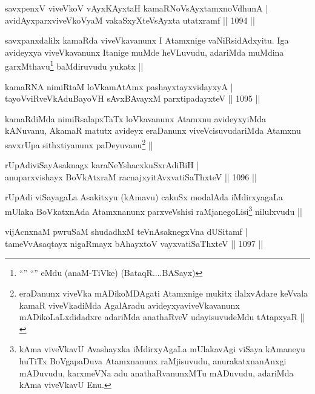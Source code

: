 \begin{shl}
savxpenxV viveVkoV vAyxKAyxtaH kamaRNoV\s sAyx\s \s tamxnoV\s dhunA | \\
avidAyxparxviveVkoV\s yaM vakaSxyXteV\s sAyxta utatxramf \hfill||  1094 ||  
\end{shl}

\begin{artha}
savxpanxdalilx kamaRda viveVkavanunx I Atamxnige vaNiRsidAdxyitu. Iga avideyxya viveVkavanunx Itanige muMde heVLuvudu, adariMda muMdina garxMthavu\footnote{``\stext'' ``\stext'' eMdu (anaM-TiVke) (BataqR....BASayx)} baMdiruvudu yukatx ||
\end{artha}


\begin{shl}
kamaRNA nimiRtaM loVkamAtAmx pashayxtayxvidayxyA | \\
tayoVviRveVkAduBayoVH sAvxBAvayxM parxtipadayxteV \hfill||  1095 ||  
\end{shl}

\begin{artha}
kamaRdiMda nimiRsalapxTaTx loVkavanunx Atamxnu avideyxyiMda kANuvanu, AkamaR matutx avideyx eraDanunx viveVcisuvudariMda Atamxnu savxrUpa sithxtiyanunx paDeyuvanu\footnote{eraDanunx viveVka mADikoMDAgati Atamxnige mukitx ilalxvAdare keVvala kamaR viveVkadiMda AgalAradu avideyxyaviveVkavanunx mADikoLaLxdidadxre adariMda anathaRveV udayisuvudeMdu tAtapxyaR ||} ||
\end{artha}


\begin{shl}
rUpAdiviSayAsaknagx karaNeYshacxkuSxrAdiBiH | \\
anuparxvishayx BoVkAtxraM racnajxyitAvx\s vatiSaThxteV \hfill||  1096 ||  
\end{shl}

\begin{artha}
rUpAdi viSayagaLa Asakitxyu (kAmavu) cakuSx modalAda iMdirxyagaLa mUlaka BoVkatxnAda Atamxnanunx parxveVshisi raMjanegoLisi\footnote{kAma viveVkavU Avashayxka iMdirxyAgaLa mUlakavAgi viSaya kAmaneyu huTiTx BoVgapaDuva Atamxnanunx raMjisuvudu, anurakatxnanAnxgi mADuvudu, karxmeVNa adu anathaRvanunxMTu mADuvudu, adariMda kAma viveVkavU Enu.} nilulxvudu ||
\end{artha}

\begin{shl}
vijAcnxnaM pwruSaM shudadhxM teVnA\s \s saknegxVna dUSitamf | \\
tameVvA\s \s saqtayx nigaRmayx bAhayxtoV vayxvatiSaThxteV \hfill||  1097 ||  
\end{shl}

